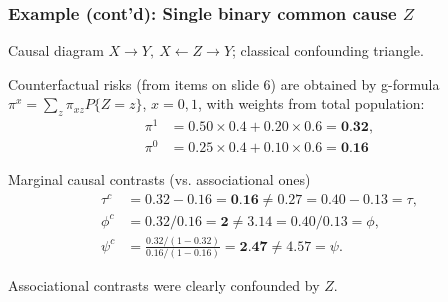 \documentclass[12pt,dvipsnames,t,aspectratio=169, handout%
]{beamer}
\begin{document}
\begin{frame}
\frametitle{\large Example (cont'd): Single binary common cause $Z$}

\bi
\item Causal diagram $X \to Y, \ X \leftarrow Z \to Y$;  classical confounding triangle.
\pause
\medskip
\item 
Counterfactual risks (from items on slide 6) are obtained by g-formula
$ \pi^x = \sum_z \pi_{xz} P\{ Z=z\} $, $x=0,1$, with weights from total population: 
\begin{align*}
  \pi^1 & = 0.50 \times 0.4 + 0.20 \times 0.6 = \textbf{0.32}, \\
	\pi^0 & = 0.25 \times 0.4 + 0.10 \times 0.6 = \textbf{0.16}
\end{align*}
\pause
\item
Marginal causal contrasts (vs. associational ones)
\begin{align*}
   \tau^c & = 0.32 - 0.16 = \textbf{0.16} \neq 0.27 = 0.40 - 0.13 =  \tau, \\
	 \phi^c & = 0.32/0.16 = \textbf{2} \neq 3.14 = 0.40/0.13 =  \phi, \\
	 \psi^c & = \frac{0.32/(1-0.32)}{0.16/(1-0.16)} = \textbf{2.47}
	                \neq 4.57 = \psi.
\end{align*}
\pause
\item
Associational contrasts were clearly confounded by $Z$.
\ei 

\end{frame}

\end{document}
